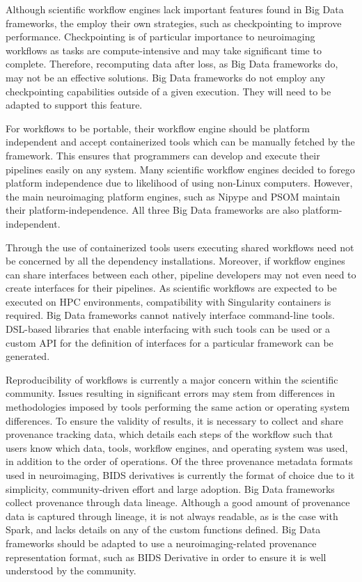         Although scientific workflow engines lack important features found in 
        Big Data frameworks, the employ their own strategies, such as 
        checkpointing to improve performance. Checkpointing is of particular 
        importance to neuroimaging workflows as tasks are compute-intensive and
        may take significant time to complete. Therefore, recomputing data after
        loss, as Big Data frameworks do, may not be an effective solutions. Big
        Data frameworks do not employ any checkpointing capabilities outside of
        a given execution. They will need to be adapted to support this feature.


        For workflows to be portable, their workflow engine should be platform
        independent and accept containerized tools which can be manually 
        fetched by the framework. This ensures that programmers can develop
        and execute their pipelines easily on any system. Many scientific 
        workflow engines decided to forego platform independence due to 
        likelihood of using non-Linux computers. However, the main neuroimaging
        platform engines, such as Nipype and PSOM maintain their 
        platform-independence. All three Big Data frameworks are also
        platform-independent.


        Through the use of containerized tools users executing shared workflows
        need not be concerned by all the dependency installations. Moreover, 
        if workflow engines can share interfaces between each other, pipeline
        developers may not even need to create interfaces for their pipelines.
        As scientific workflows are expected to be executed on HPC environments,
        compatibility with Singularity containers is required. Big Data frameworks
        cannot natively interface command-line tools. DSL-based libraries that
        enable interfacing with such tools can be used or a custom API for
        the definition of interfaces for a particular framework can be generated.


        Reproducibility of workflows is currently a major concern within the 
        scientific community. Issues resulting in significant errors may stem
        from differences in methodologies imposed by tools performing the same
        action or operating system differences. To ensure the validity of 
        results, it is necessary to collect and share provenance tracking data,
        which details each steps of the workflow such that users know which data,
        tools, workflow engines, and operating system was used, in addition to
        the order of operations. Of the three provenance metadata formats used 
        in neuroimaging, BIDS derivatives is currently the format of choice due
        to it simplicity, community-driven effort and large adoption. Big Data
        frameworks collect provenance through data lineage. Although a good 
        amount of provenance data is captured through lineage, it is not always
        readable, as is the case with Spark, and lacks details on any of the
        custom functions defined. Big Data frameworks should be adapted to use
        a neuroimaging-related provenance representation format, such as BIDS 
        Derivative in order to ensure it is well understood by the community.


